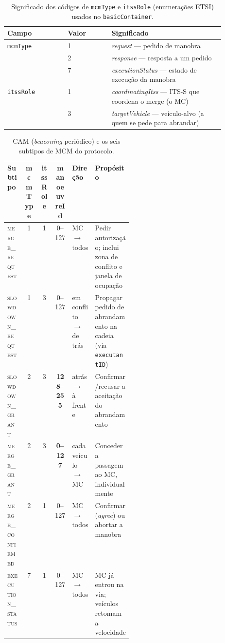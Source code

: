\documentclass[11pt,a4paper]{article}
\begin{document}
\begin{table}[H]
  \centering
  \small
  \renewcommand{\arraystretch}{1.2}
  \begin{tabular}{@{}llp{0.52\linewidth}@{}}
    \toprule
    \textbf{Campo} & \textbf{Valor} & \textbf{Significado} \\
    \midrule
    \multirow{3}{*}{\texttt{mcmType}}
      & 1 & \emph{request} --- pedido de manobra \\
      & 2 & \emph{response} --- resposta a um pedido \\
      & 7 & \emph{executionStatus} --- estado de execução da manobra \\
    \midrule
    \multirow{2}{*}{\texttt{itssRole}}
      & 1 & \emph{coordinatingItss} --- ITS-S que coordena o merge (o MC) \\
      & 3 & \emph{targetVehicle} --- veículo-alvo (a quem se pede para abrandar) \\
    \bottomrule
  \end{tabular}
  \caption{Significado dos códigos de \texttt{mcmType} e \texttt{itssRole}
  (enumerações ETSI) usados no \texttt{basicContainer}.}
  \label{tab:mcm-campos}
\end{table}

\begin{table}[H]
  \centering
  \scriptsize
  \renewcommand{\arraystretch}{1.25}
  \begin{tabular}{@{}lccclp{0.30\linewidth}@{}}
    \toprule
    \textbf{Subtipo} & \textbf{mcmType} & \textbf{itssRole} & \textbf{manoeuvreId} &
      \textbf{Direção} & \textbf{Propósito} \\
    \midrule
    \textsc{merge\_request} & 1 & 1 & 0--127 & MC $\rightarrow$ todos &
      Pedir autorização; inclui zona de conflito e janela de ocupação \\
    \textsc{slowdown\_request} & 1 & 3 & 0--127 & em conflito $\rightarrow$ de trás &
      Propagar pedido de abrandamento na cadeia (via \texttt{executantID}) \\
    \textsc{slowdown\_grant} & 2 & 3 & \textbf{128--255} & atrás $\rightarrow$ à frente &
      Confirmar/recusar a aceitação do abrandamento \\
    \textsc{merge\_grant} & 2 & 3 & \textbf{0--127} & cada veículo $\rightarrow$ MC &
      Conceder a passagem ao MC, individualmente \\
    \textsc{merge\_confirmed} & 2 & 1 & 0--127 & MC $\rightarrow$ todos &
      Confirmar (\emph{agree}) ou abortar a manobra \\
    \textsc{execution\_status} & 7 & 1 & 0--127 & MC $\rightarrow$ todos &
      MC já entrou na via; veículos retomam a velocidade \\
    \bottomrule
  \end{tabular}
  \caption{CAM (\emph{beaconing} periódico) e os seis subtipos de MCM do protocolo.}
  \label{tab:mensagens}
\end{table}
\end{document}
